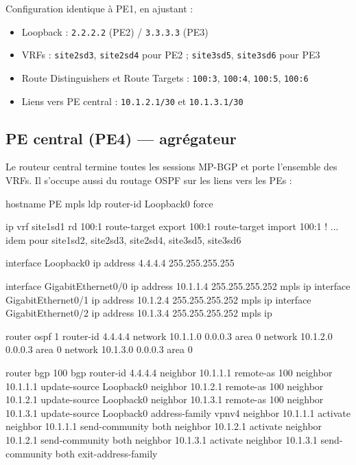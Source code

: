 \documentclass[11pt,a4paper]{article}
\begin{document}
Configuration identique à PE1, en ajustant :
\begin{itemize}
  \item Loopback : \texttt{2.2.2.2} (PE2) / \texttt{3.3.3.3} (PE3)
  \item VRFs : \texttt{site2sd3}, \texttt{site2sd4} pour PE2 ; \texttt{site3sd5}, \texttt{site3sd6} pour PE3
  \item Route Distinguishers et Route Targets : \texttt{100:3}, \texttt{100:4}, \texttt{100:5}, \texttt{100:6}
  \item Liens vers PE central : \texttt{10.1.2.1/30} et \texttt{10.1.3.1/30}
\end{itemize}

\subsection{PE central (PE4) — agrégateur}

Le routeur central termine toutes les sessions MP-BGP et porte l'ensemble des VRFs. Il s'occupe aussi du routage OSPF sur les liens vers les PEs :

\begin{ciscobox}
hostname PE
mpls ldp router-id Loopback0 force

ip vrf site1sd1
 rd 100:1
 route-target export 100:1
 route-target import 100:1
! ... idem pour site1sd2, site2sd3, site2sd4, site3sd5, site3sd6

interface Loopback0
 ip address 4.4.4.4 255.255.255.255

interface GigabitEthernet0/0
 ip address 10.1.1.4 255.255.255.252
 mpls ip
interface GigabitEthernet0/1
 ip address 10.1.2.4 255.255.255.252
 mpls ip
interface GigabitEthernet0/2
 ip address 10.1.3.4 255.255.255.252
 mpls ip

router ospf 1
 router-id 4.4.4.4
 network 10.1.1.0 0.0.0.3 area 0
 network 10.1.2.0 0.0.0.3 area 0
 network 10.1.3.0 0.0.0.3 area 0

router bgp 100
 bgp router-id 4.4.4.4
 neighbor 10.1.1.1 remote-as 100
 neighbor 10.1.1.1 update-source Loopback0
 neighbor 10.1.2.1 remote-as 100
 neighbor 10.1.2.1 update-source Loopback0
 neighbor 10.1.3.1 remote-as 100
 neighbor 10.1.3.1 update-source Loopback0
 address-family vpnv4
  neighbor 10.1.1.1 activate
  neighbor 10.1.1.1 send-community both
  neighbor 10.1.2.1 activate
  neighbor 10.1.2.1 send-community both
  neighbor 10.1.3.1 activate
  neighbor 10.1.3.1 send-community both
 exit-address-family
\end{ciscobox}
\end{document}
